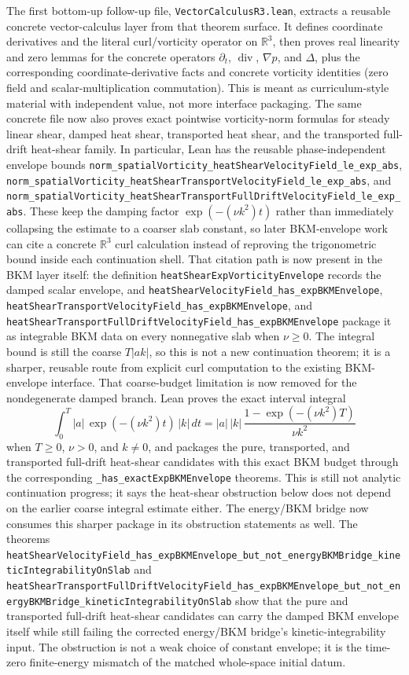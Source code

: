 \documentclass[11pt]{article}
\begin{document}
The first bottom-up follow-up file, \texttt{VectorCalculusR3.lean}, extracts a
reusable concrete vector-calculus layer from that theorem surface.  It defines
coordinate derivatives and the literal curl/vorticity operator on
\(\mathbb{R}^3\), then proves real linearity and zero lemmas for the concrete
operators \(\partial_t\), \(\operatorname{div}\), \(\nabla p\), and \(\Delta\),
plus the corresponding coordinate-derivative facts and concrete vorticity
identities (zero field and scalar-multiplication commutation).  This is
meant as curriculum-style material with independent value, not more interface
packaging.
The same concrete file now also proves exact pointwise vorticity-norm formulas
for steady linear shear, damped heat shear, transported heat shear, and the
transported full-drift heat-shear family.  In particular, Lean has the reusable
phase-independent envelope bounds
\texttt{norm\_spatialVorticity\_heatShearVelocityField\_le\_exp\_abs},
\texttt{norm\_spatialVorticity\_heatShearTransportVelocityField\_le\_exp\_abs},
and
\texttt{norm\_spatialVorticity\_heatShearTransportFullDriftVelocityField\_le\_exp\_abs}.
These keep the damping factor
\(\exp(-(\nu k^2)t)\) rather than immediately collapsing the estimate to a
coarser slab constant, so later BKM-envelope work can cite a concrete
\(\mathbb{R}^3\) curl calculation instead of reproving the trigonometric
bound inside each continuation shell.
That citation path is now present in the BKM layer itself: the definition
\texttt{heatShearExpVorticityEnvelope} records the damped scalar envelope, and
\texttt{heatShearVelocityField\_has\_expBKMEnvelope},
\texttt{heatShearTransportVelocityField\_has\_expBKMEnvelope}, and
\texttt{heatShearTransportFullDriftVelocityField\_has\_expBKMEnvelope} package
it as integrable BKM data on every nonnegative slab when \(\nu\ge 0\).  The
integral bound is still the coarse \(T|ak|\), so this is not a new continuation
theorem; it is a sharper, reusable route from explicit curl computation to the
existing BKM-envelope interface.
That coarse-budget limitation is now removed for the nondegenerate damped
branch.  Lean proves the exact interval integral
\[
  \int_0^T |a|\,\exp(-(\nu k^2)t)\,|k|\,dt
  = |a|\,|k|\,\frac{1-\exp(-(\nu k^2)T)}{\nu k^2}
\]
when \(T\ge 0\), \(\nu>0\), and \(k\ne 0\), and packages the pure,
transported, and transported full-drift heat-shear candidates with this exact
BKM budget through the corresponding
\texttt{\_has\_exactExpBKMEnvelope} theorems.  This is still not analytic
continuation progress; it says the heat-shear obstruction below does not depend
on the earlier coarse integral estimate either.
The energy/BKM bridge now consumes this sharper package in its obstruction
statements as well.  The theorems
\texttt{heatShearVelocityField\_has\_expBKMEnvelope\_but\_not\_energyBKMBridge\_kineticIntegrabilityOnSlab}
and
\texttt{heatShearTransportFullDriftVelocityField\_has\_expBKMEnvelope\_but\_not\_energyBKMBridge\_kineticIntegrabilityOnSlab}
show that the pure and transported full-drift heat-shear candidates can carry
the damped BKM envelope itself while still failing the corrected energy/BKM
bridge's kinetic-integrability input.  The obstruction is not a weak choice of
constant envelope; it is the time-zero finite-energy mismatch of the matched
whole-space initial datum.
\end{document}
